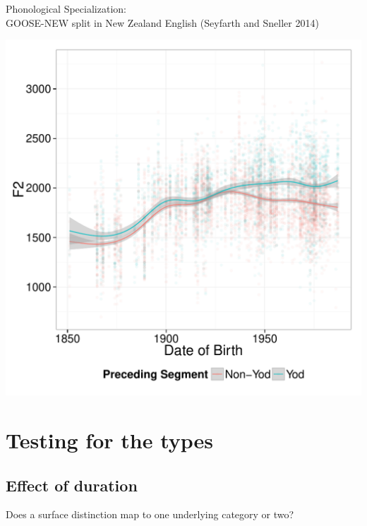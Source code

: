 \documentclass[hyperref={pdfpagelabels=false}]{beamer}
\begin{document}
\begin{frame}{Phonological Specialization: \\ \small{GOOSE-NEW split in New Zealand English (Seyfarth and Sneller 2014)}}

\begin{center}
\includegraphics[width=.8\textwidth,height=.7\textheight]{ByTokenOldPreceding.pdf}
\end{center}
\end{frame}
\section{Testing for the types}

\subsection{Effect of duration}

\begin{frame}
	\begin{center}
	Does a surface distinction map to one underlying category or two?
	\end{center}
\end{frame}
\end{document}
